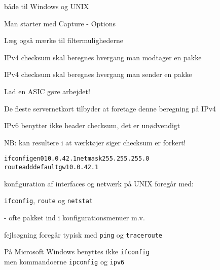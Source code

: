 \documentclass[Screen16to9,17pt]{foils}
\begin{document}

\centerline{}
\centerline{både til Windows og UNIX}



\centerline{Man starter med Capture - Options}



\centerline{Læg også mærke til filtermulighederne}


\begin{list1}
\item IPv4 checksum skal beregnes hvergang man modtager en pakke
\item IPv4 checksum skal beregnes hvergang man sender en pakke
\vskip 1cm
\item Lad en ASIC gøre arbejdet!
\item De fleste servernetkort tilbyder at foretage denne beregning på IPv4
\item IPv6 benytter ikke header checksum, det er unødvendigt
\end{list1}
\vskip 1cm

\centerline{\hlkbig NB: kan resultere i at værktøjer siger checksum er forkert!}



\begin{alltt}
ifconfig en0 10.0.42.1 netmask 255.255.255.0
route add default gw 10.0.42.1
\end{alltt}

\begin{list1}
\item konfiguration af interfaces og netværk på UNIX foregår med:
\item \verb+ifconfig+, \verb+route+ og \verb+netstat+
\item - ofte pakket ind i konfigurationsmenuer m.v.
\item fejlsøgning foregår typisk med \verb+ping+ og \verb+traceroute+
\item På Microsoft Windows benyttes ikke \verb+ifconfig+\\
men kommandoerne \verb+ipconfig+ og \verb+ipv6+
\end{list1}
\end{document}
